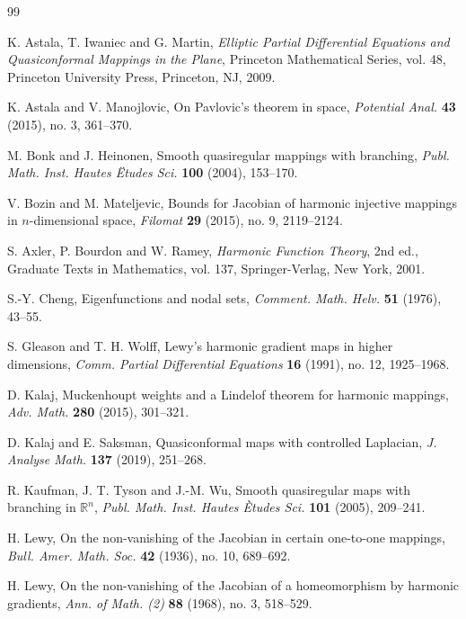 \documentclass[10pt]{amsart}
\numberwithin{equation}{section}
\theoremstyle{definition}
\newcommand{\R}{\mathbb R}
\begin{document}
\begin{thebibliography}{99}

K. Astala, T. Iwaniec and G. Martin,
\emph{Elliptic Partial Differential Equations and Quasiconformal Mappings in
the Plane},
Princeton Mathematical Series, vol. 48, Princeton University Press,
Princeton, NJ, 2009.

K. Astala and V. Manojlovic,
On Pavlovic's theorem in space,
\emph{Potential Anal.} \textbf{43} (2015), no. 3, 361--370.

M. Bonk and J. Heinonen,
Smooth quasiregular mappings with branching,
\emph{Publ. Math. Inst. Hautes \"Etudes Sci.} \textbf{100} (2004), 153--170.

V. Bozin and M. Mateljevic,
Bounds for Jacobian of harmonic injective mappings in \(n\)-dimensional
space,
\emph{Filomat} \textbf{29} (2015), no. 9, 2119--2124.

S. Axler, P. Bourdon and W. Ramey,
\emph{Harmonic Function Theory},
2nd ed., Graduate Texts in Mathematics, vol. 137, Springer-Verlag,
New York, 2001.

S.-Y. Cheng,
Eigenfunctions and nodal sets,
\emph{Comment. Math. Helv.} \textbf{51} (1976), 43--55.

S. Gleason and T. H. Wolff,
Lewy's harmonic gradient maps in higher dimensions,
\emph{Comm. Partial Differential Equations} \textbf{16} (1991), no. 12,
1925--1968.

D. Kalaj,
Muckenhoupt weights and a Lindelof theorem for harmonic mappings,
\emph{Adv. Math.} \textbf{280} (2015), 301--321.

D. Kalaj and E. Saksman,
Quasiconformal maps with controlled Laplacian,
\emph{J. Analyse Math.} \textbf{137} (2019), 251--268.

R. Kaufman, J. T. Tyson and J.-M. Wu,
Smooth quasiregular maps with branching in \(\R^n\),
\emph{Publ. Math. Inst. Hautes \`Etudes Sci.} \textbf{101} (2005), 209--241.

H. Lewy,
On the non-vanishing of the Jacobian in certain one-to-one mappings,
\emph{Bull. Amer. Math. Soc.} \textbf{42} (1936), no. 10, 689--692.

H. Lewy,
On the non-vanishing of the Jacobian of a homeomorphism by harmonic
gradients,
\emph{Ann. of Math. (2)} \textbf{88} (1968), no. 3, 518--529.


\end{thebibliography}
\end{document}
